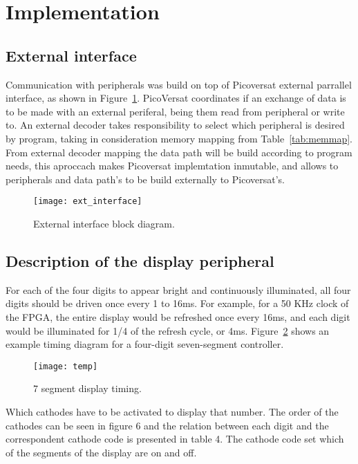 \section{Implementation}
\label{sec:impl}

\subsection{External interface}
Communication with peripherals was build on top of Picoversat external parrallel interface, as shown 
in Figure~\ref{fig:ext_interface}. PicoVersat coordinates if an exchange of data is to be made with an external periferal, 
being them read from peripheral or write to. An external decoder takes responsibility to select which 
peripheral is desired by program, taking in consideration memory mapping from Table~\ref{tab:memmap}. From external decoder 
mapping the data path will be build according to program needs, this aproccach makes Picoversat implemtation 
inmutable, and allows to peripherals and data path's to be build externally to Picoversat's.

\vspace{10pt}
\begin{figure}[!htbp]
    \centerline{\texttt{[image: ext\_interface]}}
    \vspace{0cm}\caption{External interface block diagram.}
    \label{fig:ext_interface}
\end{figure}

\clearpage
\subsection{Description of the display peripheral}

For each of the four digits to appear bright and continuously illuminated, all four digits should 
be driven once every 1 to 16ms. For example, for a 50 KHz clock of the FPGA, the entire display would be 
refreshed once every 16ms, and each digit would be illuminated for 1/4 of the refresh cycle, 
or 4ms. Figure~\ref{fig:temp} shows an example timing diagram for a four-digit seven-segment controller. 

\begin{figure}[!htbp]
    \centerline{\texttt{[image: temp]}}
    \vspace{0cm}\caption{7 segment display timing.}
    \label{fig:temp}
\end{figure}

\vspace{10pt}
\noindent Which cathodes have to be activated to display that number. The order of the 
cathodes can be seen in figure 6 and the relation between each digit and the correspondent 
cathode code is presented in table 4. The cathode code set which of the segments of the 
display are on and off. 

